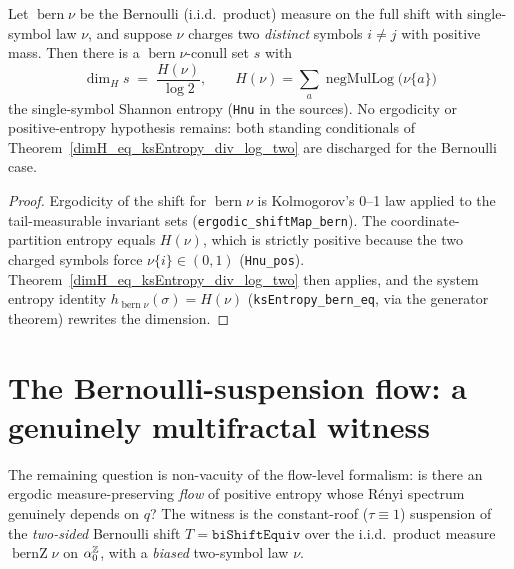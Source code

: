 \begin{theorem}\label{dimH_bern_eq_Hnu_div_log_two}
  \leanok
  Let \(\operatorname{bern}\nu\) be the Bernoulli (i.i.d.\ product) measure on the full shift
  with single-symbol law \(\nu\), and suppose \(\nu\) charges two \emph{distinct} symbols
  \(i \ne j\) with positive mass. Then there is a \(\operatorname{bern}\nu\)-conull set \(s\)
  with
  \[
    \dim_H s \;=\; \frac{H(\nu)}{\log 2},
    \qquad
    H(\nu) = \sum_{a} \operatorname{negMulLog}\bigl(\nu\{a\}\bigr)
  \]
  the single-symbol Shannon entropy (\texttt{Hnu} in the sources). No ergodicity or
  positive-entropy hypothesis remains: both standing conditionals of
  Theorem~\ref{dimH_eq_ksEntropy_div_log_two} are discharged for the Bernoulli case.
\end{theorem}
\begin{proof}\leanok
  Ergodicity of the shift for \(\operatorname{bern}\nu\) is Kolmogorov's 0--1 law applied to the
  tail-measurable invariant sets (\texttt{ergodic\_shiftMap\_bern}). The coordinate-partition
  entropy equals \(H(\nu)\), which is strictly positive because the two charged symbols force
  \(\nu\{i\} \in (0,1)\) (\texttt{Hnu\_pos}). Theorem~\ref{dimH_eq_ksEntropy_div_log_two} then
  applies, and the system entropy identity
  \(h_{\operatorname{bern}\nu}(\sigma) = H(\nu)\) (\texttt{ksEntropy\_bern\_eq}, via the
  generator theorem) rewrites the dimension.
\end{proof}

\section{The Bernoulli-suspension flow: a genuinely multifractal witness}

The remaining question is non-vacuity of the flow-level formalism: is there an ergodic
measure-preserving \emph{flow} of positive entropy whose R\'enyi spectrum genuinely depends on
\(q\)? The witness is the constant-roof (\(\tau \equiv 1\)) suspension of the \emph{two-sided}
Bernoulli shift \(T = \texttt{biShiftEquiv}\) over the i.i.d.\ product measure
\(\operatorname{bernZ}\nu\) on \(\alpha_0^{\mathbb{Z}}\), with a \emph{biased} two-symbol law \(\nu\).


